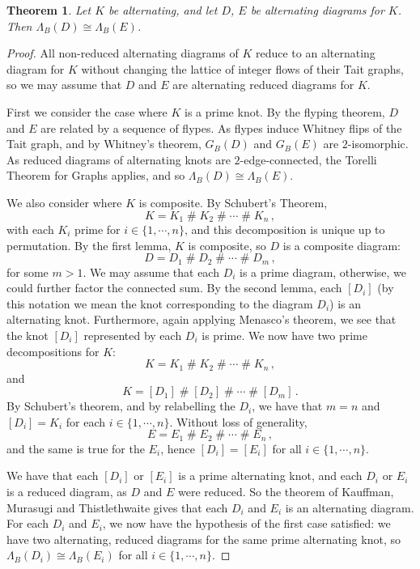 \documentclass[12pt]{report}
\newcommand{\hash}{\ensuremath{\mathbin{\#}}}
\newtheorem*{theorem}{Theorem}
\theoremstyle{upright}
\begin{document}
\begin{theorem}
	Let $K$ be alternating, and let $D$, $E$ be alternating diagrams for $K$. Then $\Lambda_{B}(D) \cong \Lambda_{B}(E)$.
\end{theorem}

\begin{proof}
All non-reduced alternating diagrams of $K$ reduce to an alternating diagram for $K$ without changing the lattice of integer flows of their Tait graphs, so we may assume that $D$ and $E$ are alternating reduced diagrams for $K$. 

First we consider the case where $K$ is a prime knot. By the flyping theorem, $D$ and $E$ are related by a sequence of flypes. As flypes induce Whitney flips of the Tait graph, and by Whitney's theorem, $G_{B}(D)$ and $G_{B}(E)$ are $2$-isomorphic. As reduced diagrams of alternating knots are $2$-edge-connected, the Torelli Theorem for Graphs applies, and so $\Lambda_{B}(D) \cong \Lambda_{B}(E)$.

We also consider where $K$ is composite. By Schubert's Theorem,
\[K = K_{1}  \hash K_{2}  \hash \cdots  \hash K_{n}\,,\]
with each $K_{i}$ prime for $i \in \{1, \cdots, n\}$, and this decomposition is unique up to permutation. By the first lemma, $K$ is composite, so $D$ is a composite diagram:
\[D = D_{1}  \hash D_{2}  \hash \cdots  \hash D_{m}\,,\]
for some $m > 1$. We may assume that each $D_{i}$ is a prime diagram, otherwise, we could further factor the connected sum. By the second lemma, each $[D_{i}]$ (by this notation we mean the knot corresponding to the diagram $D_{i}$) is an alternating knot. Furthermore, again applying Menasco's theorem, we see that the knot $[D_{i}]$ represented by each $D_{i}$ is prime. We now have two prime decompositions for $K$:
\[K = K_{1}  \hash K_{2}  \hash \cdots  \hash K_{n}\,,\]
and
\[K = [D_{1}]  \hash [D_{2}]  \hash \cdots  \hash [D_{m}]\,.\]
By Schubert's theorem, and by relabelling the $D_{i}$, we have that $m = n$ and $[D_{i}] = K_{i}$
for each $i \in \{1, \cdots, n\}$. Without loss of generality, \[E = E_{1} \hash E_{2} \hash \cdots \hash E_{n}\,,\] and the same is true for the $E_{i}$, hence
$[D_{i}] = [E_{i}]$
for all $i \in \{1, \cdots, n\}$.

We have that each $[D_{i}]$ or $[E_{i}]$ is a prime alternating knot, and each $D_{i}$ or $E_{i}$ is a reduced diagram, as $D$ and $E$ were reduced. So the theorem of Kauffman, Murasugi and Thistlethwaite gives that each $D_{i}$ and $E_{i}$ is an alternating diagram. For each $D_{i}$ and $E_{i}$, we now have the hypothesis of the first case satisfied: we have two alternating, reduced diagrams for the same prime alternating knot, so $\Lambda_{B}(D_{i}) \cong \Lambda_{B}(E_{i})$ for all $i \in \{1, \cdots, n\}$.


\end{proof}
\end{document}
